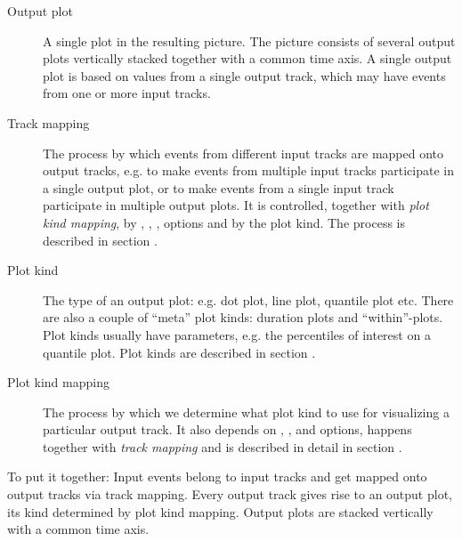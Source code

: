 \documentclass{article}
\begin{document}
\begin{description}
\item[Output plot] A single plot in the resulting picture. The picture consists of several output plots vertically stacked together with a common time axis. A single output plot is based on values from a single output track, which may have events from one or more input tracks.
\item[Track mapping] The process by which events from different input tracks are mapped onto output tracks, e.g. to make events from multiple input tracks participate in a single output plot, or to make events from a single input track participate in multiple output plots. It is controlled, together with \emph{plot kind mapping}, by , , ,  options and by the  plot kind. The process is described in section .
\item[Plot kind] The type of an output plot: e.g. dot plot, line plot, quantile plot etc. There are also a couple of ``meta'' plot kinds: duration plots and ``within''-plots. Plot kinds usually have parameters, e.g. the percentiles of interest on a quantile plot. Plot kinds are described in section .
\item[Plot kind mapping] The process by which we determine what plot kind to use for visualizing a particular output track. It also depends on , ,  and  options, happens together with \emph{track mapping} and is described in detail in section .
\end{description}

To put it together: Input events belong to input tracks and get mapped onto output tracks via track mapping. Every output track gives rise to an output plot, its kind determined by plot kind mapping. Output plots are stacked vertically with a common time axis.
\end{document}
